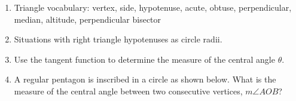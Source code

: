 \begin{enumerate}

\newpage
\item Triangle vocabulary: vertex, side, hypotenuse, acute, obtuse, perpendicular, median, altitude, perpendicular bisector

\item Situations with right triangle hypotenuses as circle radii.

\item Use the tangent function to determine the measure of the central angle $\theta$.

\item A regular pentagon is inscribed in a circle as shown below. What is the measure of the central angle between two consecutive vertices, $m\angle AOB$?


\end{enumerate}

